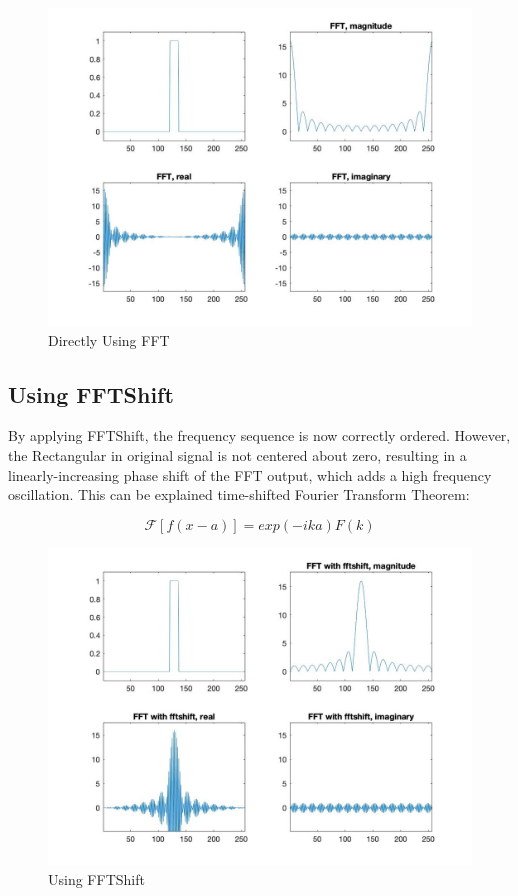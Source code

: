 \documentclass[11pt,a4paper,BCOR12mm, headexclude, footexclude, twoside, openright]{scrartcl}
\numberwithin{equation}{section} %
\numberwithin{figure}{section} %
\numberwithin{table}{section} %
\begin{document}
\begin{figure}[h!]
\centering
\includegraphics[scale=0.35]{2-1.jpg}
\caption{Directly Using FFT}
\end{figure}

\newpage
\subsection{Using FFTShift}

By applying FFTShift, the frequency sequence is now
correctly ordered. However, the Rectangular in original signal is not centered about zero, resulting in a linearly-increasing phase shift of the FFT output, which adds a high frequency oscillation. This can be explained time-shifted Fourier Transform Theorem:

\begin{equation}
    \mathcal{F}[f(x-a)] = exp(-i k a) F(k)
\end{equation}
\begin{figure}[h!]
\centering
\includegraphics[scale=0.35]{2-2.jpg}
\caption{Using FFTShift}
\end{figure}
\end{document}
